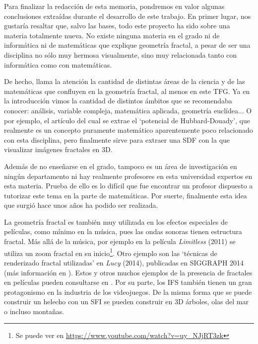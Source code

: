 %
%

Para finalizar la redacción de esta memoria, pondremos en valor algunas conclusiones extraídas durante el desarrollo de este trabajo. En primer lugar, nos gustaría resaltar que, salvo las bases, todo este proyecto ha sido sobre una materia totalmente nueva. No existe ninguna materia en el grado ni de informática ni de matemáticas que explique geometría fractal, a pesar de ser una disciplina no sólo muy hermosa visualmente, sino muy relacionada tanto con informática como con matemáticas.

De hecho, llama la atención la cantidad de distintas áreas de la ciencia y de las matemáticas que confluyen en la geometría fractal, al menos en este TFG. Ya en la introducción vimos la cantidad de distintos ámbitos que se recomendaba conocer: análisis, variable compleja, matemática aplicada, geometría euclídea... O por ejemplo, el artículo \cite{Hubbard-Douady} del cual se extrae el `potencial de Hubbard-Douady', que realmente es un concepto puramente matemático aparentemente poco relacionado con esta disciplina, pero finalmente sirve para extraer una SDF con la que visualizar imágenes fractales en 3D.

Además de no enseñarse en el grado, tampoco es un área de investigación en ningún departamento ni hay realmente profesores en esta universidad expertos en esta materia. Prueba de ello es lo difícil que fue encontrar un profesor dispuesto a tutorizar este tema en la parte de matemáticas. Por suerte, finalmente esta idea que surgió hace unos años ha podido ser realizada.

La geometría fractal es también muy utilizada en los efectos especiales de películas, como mínimo en la música, pues las ondas sonoras tienen estructura fractal. Más allá de la música, por ejemplo en la película \textit{Limitless} (2011) se utiliza un zoom fractal en su inicio\footnote{Se puede ver en \url{https://www.youtube.com/watch?v=uy_NJjRT3zk}}. Otro ejemplo son las `técnicas de renderizado fractal utilizadas' en \textit{Lucy} (2014), publicadas en SIGGRAPH 2014 (más información en \cite{SIGGRAPH-2014}). Estos y otros muchos ejemplos de la presencia de fractales en películas pueden consultarse en \cite{fractals-films}. Por su parte, los IFS también tienen un gran protagonismo en la industria de los videojuegos. De la misma forma que se puede construir un helecho con un SFI se pueden construir en 3D árboles, olas del mar o incluso montañas. 

